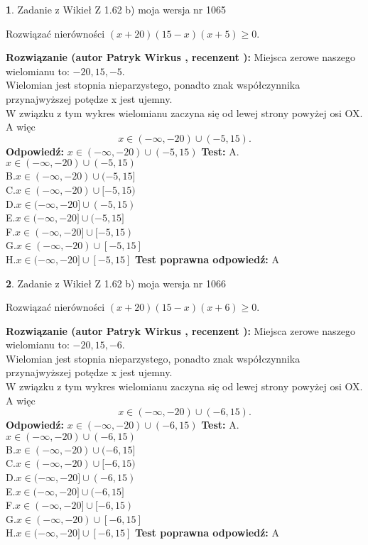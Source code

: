 \documentclass[12pt, a4paper]{article}
\theoremstyle{definition} %
\newtheorem{zad}{}
\newcommand{\zadStart}[1]{\begin{zad}#1\newline}
\newcommand{\zadStop}{\end{zad}}
\newcommand{\rozwStart}[2]{\noindent \textbf{Rozwiązanie (autor #1 , recenzent #2): }\newline}
\newcommand{\rozwStop}{\newline}
\newcommand{\odpStart}{\noindent \textbf{Odpowiedź:}\newline}
\newcommand{\odpStop}{\newline}
\newcommand{\testStart}{\noindent \textbf{Test:}\newline}
\newcommand{\testStop}{\newline}
\newcommand{\kluczStart}{\noindent \textbf{Test poprawna odpowiedź:}\newline}
\newcommand{\kluczStop}{\newline}
\begin{document}
\zadStart{Zadanie z Wikieł Z 1.62 b) moja wersja nr 1065}

Rozwiązać nierówności $(x+20)(15-x)(x+5)\ge0$.
\zadStop
\rozwStart{Patryk Wirkus}{}
Miejsca zerowe naszego wielomianu to: $-20, 15, -5$.\\
Wielomian jest stopnia nieparzystego, ponadto znak współczynnika przy\linebreak najwyższej potędze x jest ujemny.\\ W związku z tym wykres wielomianu zaczyna się od lewej strony powyżej osi OX. A więc $$x \in (-\infty,-20) \cup (-5,15).$$
\rozwStop
\odpStart
$x \in (-\infty,-20) \cup (-5,15)$
\odpStop
\testStart
A.$x \in (-\infty,-20) \cup (-5,15)$\\
B.$x \in (-\infty,-20) \cup (-5,15]$\\
C.$x \in (-\infty,-20) \cup [-5,15)$\\
D.$x \in (-\infty,-20] \cup (-5,15)$\\
E.$x \in (-\infty,-20] \cup (-5,15]$\\
F.$x \in (-\infty,-20] \cup [-5,15)$\\
G.$x \in (-\infty,-20) \cup [-5,15]$\\
H.$x \in (-\infty,-20] \cup [-5,15]$
\testStop
\kluczStart
A
\kluczStop



\zadStart{Zadanie z Wikieł Z 1.62 b) moja wersja nr 1066}

Rozwiązać nierówności $(x+20)(15-x)(x+6)\ge0$.
\zadStop
\rozwStart{Patryk Wirkus}{}
Miejsca zerowe naszego wielomianu to: $-20, 15, -6$.\\
Wielomian jest stopnia nieparzystego, ponadto znak współczynnika przy\linebreak najwyższej potędze x jest ujemny.\\ W związku z tym wykres wielomianu zaczyna się od lewej strony powyżej osi OX. A więc $$x \in (-\infty,-20) \cup (-6,15).$$
\rozwStop
\odpStart
$x \in (-\infty,-20) \cup (-6,15)$
\odpStop
\testStart
A.$x \in (-\infty,-20) \cup (-6,15)$\\
B.$x \in (-\infty,-20) \cup (-6,15]$\\
C.$x \in (-\infty,-20) \cup [-6,15)$\\
D.$x \in (-\infty,-20] \cup (-6,15)$\\
E.$x \in (-\infty,-20] \cup (-6,15]$\\
F.$x \in (-\infty,-20] \cup [-6,15)$\\
G.$x \in (-\infty,-20) \cup [-6,15]$\\
H.$x \in (-\infty,-20] \cup [-6,15]$
\testStop
\kluczStart
A
\kluczStop
\end{document}
